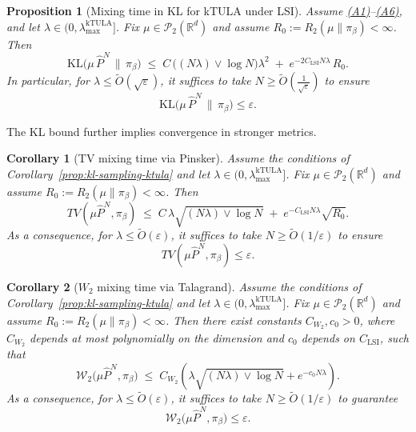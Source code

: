 \documentclass[11pt,a4paper,reqno]{amsart}
\theoremstyle{plain}
\newtheorem{proposition}{Proposition}
\newtheorem{corollary}{Corollary}
\theoremstyle{definition}
\theoremstyle{remark}
\newcommand{\R}{\mathbb{R}}
\newcommand{\KL}{\mathrm{KL}}
\newcommand{\W}{\mathcal{W}_2}
\begin{document}
\begin{proposition}[Mixing time in KL for kTULA under LSI]
\label{prop:mixing-time-kl-ktula}
Assume \hyperref[ass:PJG]{\textup{(A1)}}--\hyperref[ass:LSI]{\textup{(A6)}}, and let $\lambda\in(0,\lambda_{\max}^{\mathrm{kTULA}}]$.
Fix $\mu\in\mathcal P_2(\R^d)$ and assume $R_0:=R_2(\mu\|\pi_\beta)<\infty$.
Then
\[
\KL\!\bigl(\mu\,\widehat P^{N}\,\big\|\,\pi_\beta\bigr)
\;\le\;
C\,\bigl((N\lambda)\vee \log N\bigr)\lambda^2
\;+\;
e^{-2C_{\mathrm{LSI}}N\lambda}\,R_0.
\]
In particular, for $\lambda \le \widetilde O(\sqrt{\varepsilon})$, it suffices to take $N \ge \widetilde{O}\!\left(\frac{1}{\sqrt{\varepsilon}}\right)$
to ensure
\[
\KL\!\bigl(\mu\,\widehat P^{N}\,\big\|\,\pi_\beta\bigr)\le \varepsilon.
\]
\end{proposition}

\medskip
\noindent
The KL bound further implies convergence in stronger metrics.

\begin{corollary}[TV mixing time via Pinsker]
\label{cor:tv-mixing-ktula}
Assume the conditions of Corollary~\ref{prop:kl-sampling-ktula} and let $\lambda\in(0,\lambda_{\max}^{\mathrm{kTULA}}]$. Fix $\mu\in\mathcal P_2(\R^d)$ and assume $R_0:=R_2(\mu\|\pi_\beta)<\infty$.
Then
\[
TV(\mu\widehat P^{N},\pi_\beta)
\;\le\;
C\,\lambda \sqrt{(N\lambda)\vee \log N}
\;+\;
e^{-C_{\mathrm{LSI}}N\lambda}\sqrt{R_0}.
\]
As a consequence, for $\lambda \le \widetilde O(\varepsilon)$, it suffices to take $N \ge \widetilde O(1/\varepsilon)$ to ensure
\[
TV(\mu\widehat P^{N},\pi_\beta)\le \varepsilon.
\]
\end{corollary}

\begin{corollary}[$W_2$ mixing time via Talagrand]
\label{cor:w2-mixing-ktula}
Assume the conditions of Corollary~\ref{prop:kl-sampling-ktula} and let $\lambda\in(0,\lambda_{\max}^{\mathrm{kTULA}}]$. Fix $\mu\in\mathcal P_2(\R^d)$ and assume $R_0:=R_2(\mu\|\pi_\beta)<\infty$.
Then there exist constants $C_{W_2},c_0>0$, where $C_{W_2}$ depends at most polynomially on the dimension and $c_0$ depends on $C_{\mathrm{LSI}}$, such that
\[
\W\!\bigl(\mu\widehat P^{N},\pi_\beta\bigr)
\;\le\;
C_{W_2}\!\left(
\lambda\sqrt{(N\lambda)\vee\log N}
+
e^{-c_0 N\lambda}
\right).
\]
As a consequence, for $\lambda \le \widetilde O(\varepsilon)$, it suffices to take $N \ge \widetilde O(1/\varepsilon)$ to guarantee
\[
\W\!\bigl(\mu\widehat P^{N},\pi_\beta\bigr)\le \varepsilon.
\]
\end{corollary}
\end{document}
